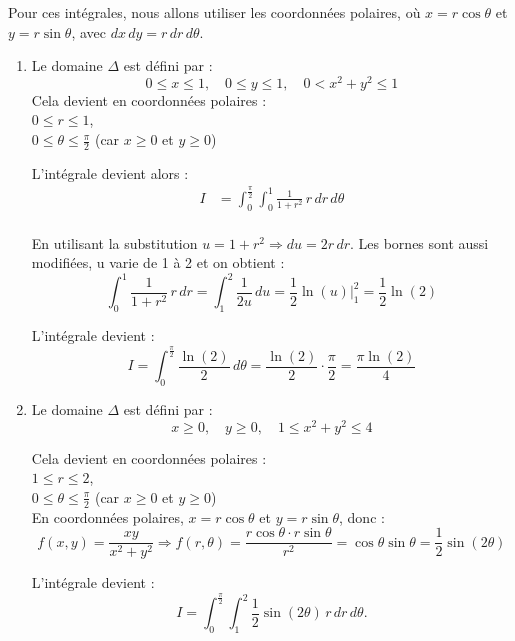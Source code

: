 \begin{solution}
    Pour ces intégrales, nous allons utiliser les coordonnées polaires, où \( x = r \cos \theta \) et \( y = r \sin \theta \), avec \( dx \, dy = r \, dr \, d\theta \).
    \begin{enumerate}[label=(\alph*)]
        \item Le domaine \( \Delta \) est défini par :
        \[
        0 \leq x \leq 1, \quad 0 \leq y \leq 1, \quad 0 < x^2 + y^2 \leq 1
        \]
        Cela devient en coordonnées polaires : \\
        \( 0 \leq r \leq 1 \), \\
        \( 0 \leq \theta \leq \frac{\pi}{2} \) (car \( x \geq 0 \) et \( y \geq 0 \))

        L'intégrale devient alors :
        \[
        \begin{aligned}
            I &= \int_0^{\frac{\pi}{2}} \int_0^1 \frac{1}{1 + r^2} \, r \, dr \, d\theta \\
        \end{aligned}
        \]

        En utilisant la substitution \( u = 1 + r^2 \Rightarrow du = 2r \, dr \). Les bornes sont aussi modifiées, u varie de 1 à 2 et on obtient :
        \[
        \int_0^1 \frac{1}{1 + r^2} \, r \, dr = \int_1^2 \frac{1}{2u} \, du = \frac{1}{2} \ln(u) \Big|_1^2 = \frac{1}{2} \ln(2)
        \]

        L'intégrale devient :
        \[
        I = \int_0^{\frac{\pi}{2}} \frac{\ln(2)}{2} \, d\theta = \frac{\ln(2)}{2} \cdot \frac{\pi}{2} = \frac{\pi \ln(2)}{4}
        \]

        \item Le domaine \( \Delta \) est défini par :
        \[
        x \geq 0, \quad y \geq 0, \quad 1 \leq x^2 + y^2 \leq 4
        \]

        Cela devient en coordonnées polaires : \\
        \( 1 \leq r \leq 2 \), \\
        \( 0 \leq \theta \leq \frac{\pi}{2} \) (car \( x \geq 0 \) et \( y \geq 0 \)) \\

        En coordonnées polaires, \( x = r \cos \theta \) et \( y = r \sin \theta \), donc :
        \[
        f(x,y) = \frac{xy}{x^2 + y^2} \Rightarrow f(r,\theta) = \frac{r \cos \theta \cdot r \sin \theta}{r^2} = \cos \theta \sin \theta = \frac{1}{2} \sin(2\theta)
        \]

        L'intégrale devient :
        \[
        I = \int_0^{\frac{\pi}{2}} \int_1^2 \frac{1}{2} \sin(2\theta) \, r \, dr \, d\theta.
        \]
        

\end{enumerate}
\end{solution}
